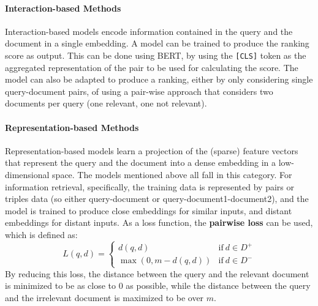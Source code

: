 \paragraph{Interaction-based Methods}
\sloppy
Interaction-based models encode information contained in the query and the document in a single embedding. A model can be trained to produce the ranking score as output. This can be done using BERT, by using the \texttt{[CLS]} token as the aggregated representation of the pair to be used for calculating the score. The model can also be adapted to produce a ranking, either by only considering single query-document pairs, of using a pair-wise approach that considers two documents per query (one relevant, one not relevant).

\fussy
\paragraph{Representation-based Methods}
Representation-based models learn a projection of the (sparse) feature vectors that represent the query and the document into a dense embedding in a low-dimensional space. The models mentioned above all fall in this category. For information retrieval, specifically, the training data is represented by pairs or triples data (so either query-document or query-document1-document2), and the model is trained to produce close embeddings for similar inputs, and distant embeddings for distant inputs. As a loss function, the \textbf{pairwise loss} can be used, which is defined as:
\begin{equation*}
    L(q,d) = \begin{cases}
        d(q,d) & \text{if} \ d \in D^+ \\
        \max(0, m - d(q,d)) &\text{if} \ d \in D^-
    \end{cases}
\end{equation*}
By reducing this loss, the distance between the query and the relevant document is minimized to be as close to 0 as possible, while the distance between the query and the irrelevant document is maximized to be over $m$.

